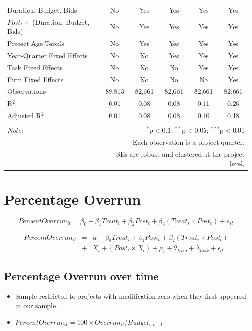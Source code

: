 \documentclass[
]{article}
\providecommand{\tightlist}{%
  \setlength{\itemsep}{0pt}\setlength{\parskip}{0pt}}
\begin{document}
\begin{table}[H]
\begin{tabular}{@{\extracolsep{-2pt}}lccccc}
Duration, Budget, Bids & No & Yes & Yes & Yes & Yes \\ 
$Post_t \times$  (Duration, Budget, Bids) & No & Yes & Yes & Yes & Yes \\ 
Project Age Tercile & No & Yes & Yes & Yes & Yes \\ 
Year-Quarter Fixed Effects & No & No & Yes & Yes & Yes \\ 
Task Fixed Effects & No & No & No & Yes & Yes \\ 
Firm Fixed Effects & No & No & No & No & Yes \\ 
Observations & 89,813 & 82,661 & 82,661 & 82,661 & 82,661 \\ 
R$^{2}$ & 0.01 & 0.08 & 0.08 & 0.11 & 0.26 \\ 
Adjusted R$^{2}$ & 0.01 & 0.08 & 0.08 & 0.10 & 0.18 \\ 
\hline 
\hline \\[-1.8ex] 
\textit{Note:}  & \multicolumn{5}{r}{$^{*}$p$<$0.1; $^{**}$p$<$0.05; $^{***}$p$<$0.01} \\ 
 & \multicolumn{5}{r}{Each observation is a project-quarter.} \\ 
 & \multicolumn{5}{r}{SEs are robust and clustered at the project level.} \\ 
\end{tabular} 
\end{table}

\hypertarget{percentage-overrun}{%
\section{Percentage Overrun}\label{percentage-overrun}}

\[ PercentOverrun_{it} = \beta_0 + \beta_1 Treat_i + \beta_2 Post_t + \beta_3 (Treat_i \times Post_t) + e_{it}\]

\[ \begin{aligned} PercentOverrun_{it} &=& \alpha+\beta_0 Treat_i + \beta_1 Post_t + \beta_2 (Treat_i \times Post_t)\\
&+&  X_i + (Post_t \times X_i) + \mu_t + \theta_{firm} + \lambda_{task}+ \epsilon_{it}
\end{aligned}\]

\hypertarget{percentage-overrun-over-time}{%
\subsection{Percentage Overrun over
time}\label{percentage-overrun-over-time}}

\begin{itemize}
\tightlist
\item
  Sample restricted to projects with modification zero when they first
  appeared in our sample.
\item
  \(PercentOverrun_{it}=100 \times Overrun_{it}/Budget_{i,t-1}\)
\end{itemize}
\end{document}
